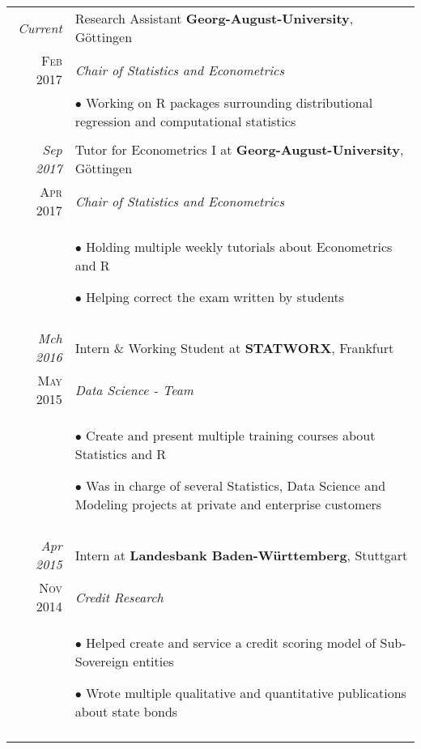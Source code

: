 \documentclass[a4paper,10pt]{article} %
\begin{document}
\begin{longtable}{r|p{10cm}}


  \emph{Current} & Research Assistant \textbf{Georg-August-University}, Göttingen\\
  \textsc{Feb 2017} & \emph{Chair of Statistics and Econometrics}\\
  & \footnotesize{
  $\bullet$ Working on R packages surrounding distributional regression and computational statistics}\\
  \multicolumn{2}{c}{} \\


  \emph{Sep 2017} & Tutor for Econometrics I at \textbf{Georg-August-University}, Göttingen\\
  \textsc{Apr 2017} & \emph{Chair of Statistics and Econometrics}\\
  & \footnotesize{$\bullet$ Holding multiple weekly tutorials about Econometrics and R

  $\bullet$ Helping correct the exam written by students}\\
  \multicolumn{2}{c}{} \\


\emph{Mch 2016} & Intern \& Working Student at \textbf{STATWORX}, Frankfurt\\
\textsc{May 2015} & \emph{Data Science - Team} \\
& \footnotesize{$\bullet$ Create and present multiple training courses about Statistics and R

$\bullet$ Was in charge of several Statistics, Data Science and Modeling projects at private and enterprise customers}\\
\multicolumn{2}{c}{} \\


\emph{Apr 2015} & Intern at \textbf{Landesbank Baden-Württemberg}, Stuttgart\\
\textsc{Nov 2014} & \emph{Credit Research} \\
& \footnotesize{
$\bullet$ Helped create and service a credit scoring model of Sub-Sovereign entities

$\bullet$ Wrote multiple qualitative and quantitative publications about state bonds}\\
\multicolumn{2}{c}{} \\


\end{longtable}
\end{document}
